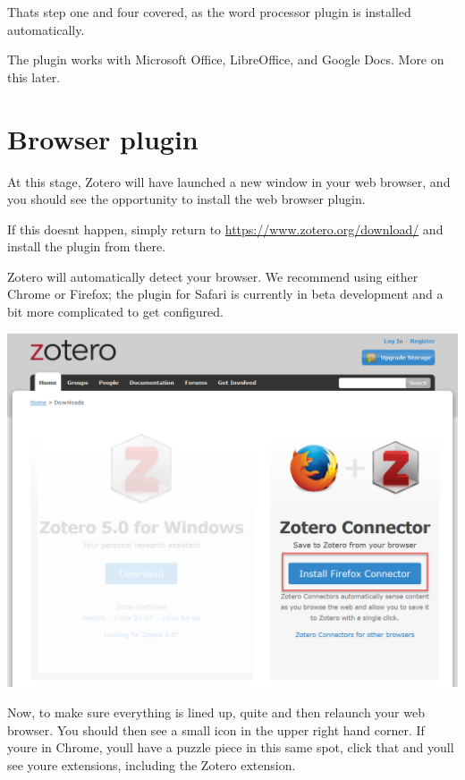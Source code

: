 \documentclass[
]{book}
\begin{document}
That\textquotesingle s step one and four covered, as the word processor plugin is installed automatically.

The plugin works with Microsoft Office, LibreOffice, and Google Docs. More on this later.

\hypertarget{browser-plugin}{%
\section{Browser plugin}\label{browser-plugin}}

At this stage, Zotero will have launched a new window in your web browser, and you should see the opportunity to install the web browser plugin.

If this doesn\textquotesingle t happen, simply return to \url{https://www.zotero.org/download/} and install the plugin from there.

Zotero will automatically detect your browser. We recommend using either Chrome or Firefox; the plugin for Safari is currently in beta development and a bit more complicated to get configured.

\includegraphics{images/Z_BrowserPluginZotero.png}

Now, to make sure everything is lined up, quite and then relaunch your web browser. You should then see a small icon in the upper right hand corner. If you\textquotesingle re in Chrome, you\textquotesingle ll have a puzzle piece in this same spot, click that and you\textquotesingle ll see you\textquotesingle re extensions, including the Zotero extension.
\end{document}
